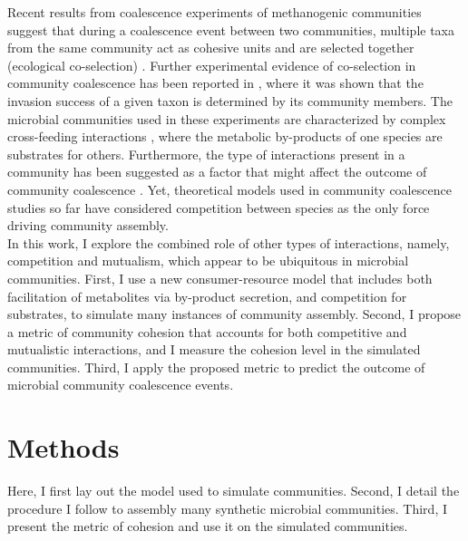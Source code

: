 \documentclass[titlepage,11pt]{article}
\begin{document}
\begin{linenumbers}
\begin{singlespace}
		Recent results from coalescence experiments of methanogenic communities suggest that during a coalescence event between two communities, multiple taxa from the same community act as cohesive units and are selected together (ecological co-selection) \citep{Sierocinski2017}. Further experimental evidence of co-selection in community coalescence has been reported in \citet{Lu2018}, where it was shown that the invasion success of a given taxon is determined by its community members. The microbial communities used in these experiments are characterized by complex cross-feeding interactions \citep{Hansen2007, Lawrence2012, Embree2015}, where the metabolic by-products of one species are substrates for others. Furthermore, the type of interactions present in a community has been suggested as a factor that might affect the outcome of community coalescence \citep{Castledine2020}.  Yet, theoretical models used in community coalescence studies so far have considered competition between species as the only force driving community assembly.\\
		In this work, I explore the combined role of other types of interactions, namely, competition and mutualism, which appear to be ubiquitous in microbial communities. First, I use a new consumer-resource model that includes both facilitation of metabolites via by-product secretion, and competition for substrates, to simulate many instances of community assembly. Second, I propose a metric of community cohesion that accounts for both competitive and mutualistic interactions, and I measure the cohesion level in the simulated communities. Third, I apply the proposed metric to predict the outcome of microbial community coalescence events.
		\section{Methods}
			Here, I first lay out the model used to simulate communities. Second, I detail the procedure I follow to assembly many synthetic microbial communities. Third, I present the metric of cohesion and use it on the simulated communities.

\end{singlespace}
\end{linenumbers}
\end{document}
